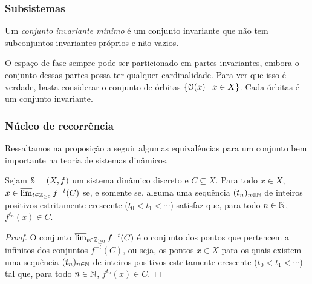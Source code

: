\begin{comment}
\end{comment}

\subsubsection{Subsistemas}

\begin{definition}
Um \emph{conjunto invariante mínimo} é um conjunto invariante que não tem subconjuntos invariantes próprios e não vazios.
\end{definition}

O espaço de fase sempre pode ser particionado em partes invariantes, embora o conjunto dessas partes possa ter qualquer cardinalidade. Para ver que isso é verdade, basta considerar o conjunto de órbitas $\left\{{\mathcal{O}(x)}\;\middle\vert\;{x \in X}\right\}$. Cada órbitas é um conjunto invariante.

\subsubsection{Núcleo de recorrência}
Ressaltamos na proposição a seguir algumas equivalências para um conjunto bem importante na teoria de sistemas dinâmicos.

\begin{proposition}
\label{prop:nucleo.recorrencia}
Sejam $\mathcal{S}=(X,f)$ um sistema dinâmico discreto e $C \subseteq X$.%
Para todo $x \in X$, $x \in \varlimsup_{t \in \mathbb{Z}_{\geq 0}} f^{-t}(C)$ se, e somente se, alguma uma sequência $(t_n)_{n \in \mathbb{N}}$ de inteiros positivos estritamente crescente ($t_0 < t_1 < \cdots$) satisfaz que, para todo $n \in \mathbb{N}$, $f^{t_n}(x) \in C$.
\end{proposition}
\begin{proof}
O conjunto $\varlimsup_{t \in \mathbb{Z}_{\geq 0}} f^{-t}(C)$ é o conjunto dos pontos que pertencem a infinitos dos conjuntos $f^{-t}(C)$, ou seja, os pontos $x \in X$ %
para os quais existem uma sequência $(t_n)_{n \in \mathbb{N}}$ de inteiros positivos estritamente crescente ($t_0 < t_1 < \cdots$) tal que, para todo $n \in \mathbb{N}$, $f^{t_n}(x) \in C$.
\end{proof}

